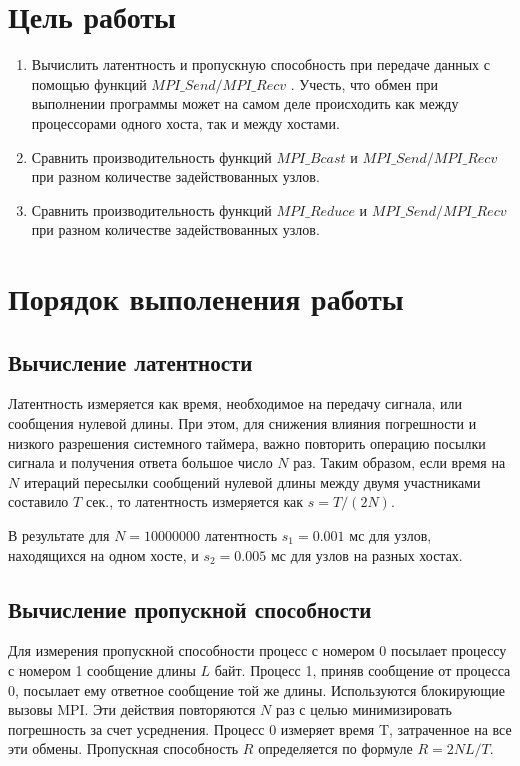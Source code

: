 	\section{Цель работы}
		\begin{enumerate}
			\item Вычислить латентность и пропускную способность при передаче данных с помощью функций $ MPI\_Send/MPI\_Recv $ . Учесть, что обмен при выполнении программы может на самом деле происходить как между процессорами одного хоста, так и между хостами.
			\item Сравнить производительность функций $ MPI\_Bcast $ и $ MPI\_Send/MPI\_Recv $ при разном количестве задействованных узлов.
			\item Сравнить производительность функций $ MPI\_Reduce $ и $ MPI\_Send / MPI\_Recv $ при разном количестве задействованных узлов.
		\end{enumerate}		
	\section{Порядок выполенения работы}
		\subsection{Вычисление латентности}
			Латентность измеряется как время, необходимое на передачу сигнала, или сообщения нулевой длины. При этом, для снижения влияния погрешности и низкого разрешения системного таймера, важно повторить операцию посылки сигнала и получения ответа большое число $ N $ раз. Таким образом, если время на $ N $ итераций пересылки сообщений нулевой длины между двумя участниками составило $ T $ сек., то латентность измеряется как $s=T/(2N)$.
			
			В результате для $ N = 10000000 $ латентность $ s_1 = 0.001 $ мс для узлов, находящихся на одном хосте, и $ s_2 = 0.005 $ мс для узлов на разных хостах.
			
		\subsection{Вычисление пропускной способности}
			Для измерения пропускной способности процесс с номером 0 посылает процессу с номером 1 сообщение длины $ L $ байт. Процесс 1, приняв сообщение от процесса 0, посылает ему ответное сообщение той же длины. Используются блокирующие вызовы MPI. Эти действия повторяются $ N $ раз с целью минимизировать погрешность за счет усреднения. Процесс 0 измеряет время T, затраченное на все эти обмены. Пропускная способность $ R $ определяется по формуле $ R=2NL/T $.
			
